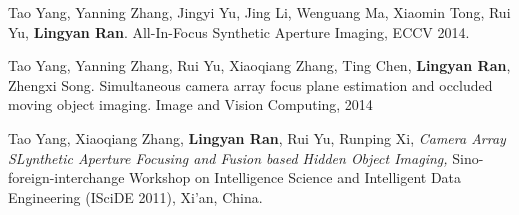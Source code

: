 \documentclass[margin]{res}
\begin{document}
\begin{resume}
                Tao Yang, Yanning Zhang, Jingyi Yu, Jing Li, Wenguang Ma, Xiaomin Tong, Rui Yu, \textbf{Lingyan Ran}. All-In-Focus Synthetic Aperture Imaging, ECCV 2014.

                Tao Yang, Yanning Zhang, Rui Yu, Xiaoqiang Zhang, Ting Chen, \textbf{Lingyan Ran}, Zhengxi Song. Simultaneous
                camera array focus plane estimation and occluded moving object imaging. Image and Vision Computing, 2014

                Tao Yang, Xiaoqiang Zhang, \textbf{Lingyan Ran}, Rui Yu, Runping Xi, {\sl Camera Array SLynthetic Aperture Focusing and
                Fusion based Hidden Object Imaging,} Sino-foreign-interchange Workshop on Intelligence Science and Intelligent
                Data Engineering (ISciDE 2011), Xi’an, China.




\end{resume}
\end{document}

